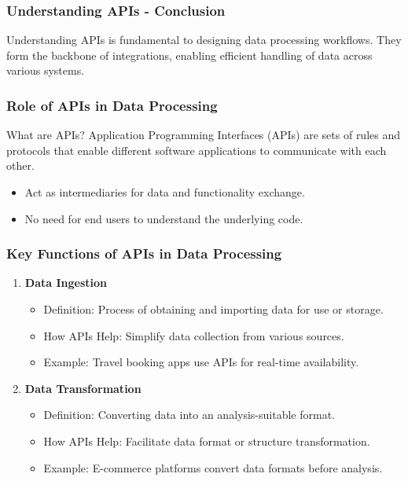\documentclass[aspectratio=169]{beamer}
\begin{document}
\begin{frame}[fragile]
    \frametitle{Understanding APIs - Conclusion}
    Understanding APIs is fundamental to designing data processing workflows. They form the backbone of integrations, enabling efficient handling of data across various systems.
\end{frame}

\begin{frame}[fragile]
    \frametitle{Role of APIs in Data Processing}
    \begin{block}{What are APIs?}
        Application Programming Interfaces (APIs) are sets of rules and protocols that enable different software applications to communicate with each other.
    \end{block}
    \begin{itemize}
        \item Act as intermediaries for data and functionality exchange.
        \item No need for end users to understand the underlying code.
    \end{itemize}
\end{frame}

\begin{frame}[fragile]
    \frametitle{Key Functions of APIs in Data Processing}
    \begin{enumerate}
        \item \textbf{Data Ingestion}
            \begin{itemize}
                \item Definition: Process of obtaining and importing data for use or storage.
                \item How APIs Help: Simplify data collection from various sources.
                \item Example: Travel booking apps use APIs for real-time availability.
            \end{itemize}
        \item \textbf{Data Transformation}
            \begin{itemize}
                \item Definition: Converting data into an analysis-suitable format.
                \item How APIs Help: Facilitate data format or structure transformation.
                \item Example: E-commerce platforms convert data formats before analysis.
            \end{itemize}
    \end{enumerate}
\end{frame}
\end{document}
